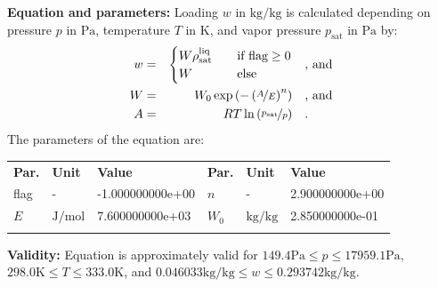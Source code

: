 \textbf{Equation and parameters:}
\newline
%
Loading $w$ in $\si{\kilogram\per\kilogram}$ is calculated depending on pressure $p$ in $\si{\pascal}$, temperature $T$ in $\si{\kelvin}$, and vapor pressure $p_\mathrm{sat}$ in $\si{\pascal}$ by:
%
\begin{equation*}
\begin{split}
w &=& \begin{cases} W \rho_\mathrm{sat}^{\mathrm{liq}} & \quad \text{if flag} \geq 0 \\ W & \quad \text{else} \end{cases} & \quad\text{, and} \\
W &=& W_0 \exp \left( - \left( \nicefrac{A}{E} \right) ^{n} \right) & \quad\text{, and} \\
A &=& R T \ln \left( \nicefrac{p_\mathrm{sat}}{p} \right) & \quad\text{.} \\
\end{split}
\end{equation*}
%
The parameters of the equation are:
%
\begin{longtable}[l]{lll|lll}
\toprule
\addlinespace
\textbf{Par.} & \textbf{Unit} & \textbf{Value} &	\textbf{Par.} & \textbf{Unit} & \textbf{Value} \\
\addlinespace
\midrule
\endhead

\bottomrule
\endfoot
\bottomrule
\endlastfoot
\addlinespace

flag & - & -1.000000000e+00 & $n$ & - & 2.900000000e+00 \\
$E$ & $\si{\joule\per\mole}$ & 7.600000000e+03 & $W_0$ & $\si{\kilogram\per\kilogram}$ & 2.850000000e-01 \\

\addlinespace\end{longtable}

\textbf{Validity:}
\newline
Equation is approximately valid for $149.4 \si{\pascal} \leq p \leq 17959.1 \si{\pascal}$,  $298.0 \si{\kelvin} \leq T \leq 333.0 \si{\kelvin}$, and $0.046033 \si{\kilogram\per\kilogram} \leq w \leq 0.293742 \si{\kilogram\per\kilogram}$.
\newline

